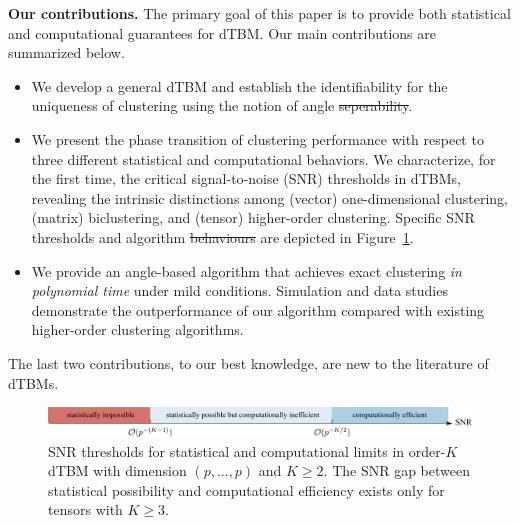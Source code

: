 \documentclass[lettersize,onecolumn,journal]{IEEEtran}
\theoremstyle{definition}
\theoremstyle{definition}
\providecommand{\DIFaddtex}[1]{{\protect\color{blue}\uwave{#1}}} %
\providecommand{\DIFdeltex}[1]{{\protect\color{red}\sout{#1}}}                      %
\providecommand{\DIFaddbegin}{} %
\providecommand{\DIFaddend}{} %
\providecommand{\DIFdelbegin}{} %
\providecommand{\DIFdelend}{} %
\providecommand{\DIFadd}[1]{\texorpdfstring{\DIFaddtex{#1}}{#1}} %
\providecommand{\DIFdel}[1]{\texorpdfstring{\DIFdeltex{#1}}{}} %
\newcommand{\DIFscaledelfig}{0.5}
\newlength{\DIFdelgraphicswidth} %
\newlength{\DIFdelgraphicsheight} %
\newcommand{\DIFaddincludegraphics}[2][]{{\color{blue}\fbox{\DIFOincludegraphics[#1]{#2}}}} %
\newcommand{\DIFdelincludegraphics}[2][]{%
\sbox{\DIFdelgraphicsbox}{\DIFOincludegraphics[#1]{#2}}%
\settoboxwidth{\DIFdelgraphicswidth}{\DIFdelgraphicsbox} %
\settoboxtotalheight{\DIFdelgraphicsheight}{\DIFdelgraphicsbox} %
\scalebox{\DIFscaledelfig}{%
\parbox[b]{\DIFdelgraphicswidth}{\usebox{\DIFdelgraphicsbox}\\[-\baselineskip] \rule{\DIFdelgraphicswidth}{0em}}\llap{\resizebox{\DIFdelgraphicswidth}{\DIFdelgraphicsheight}{%
\setlength{\unitlength}{\DIFdelgraphicswidth}%
\begin{picture}(1,1)%
\thicklines\linethickness{2pt} %
{\color[rgb]{1,0,0}\put(0,0){\framebox(1,1){}}}%
{\color[rgb]{1,0,0}\put(0,0){\line( 1,1){1}}}%
{\color[rgb]{1,0,0}\put(0,1){\line(1,-1){1}}}%
\end{picture}%
}\hspace*{3pt}}} %
} %
\DeclareRobustCommand{\DIFaddbegin}{\DIFOaddbegin \let\includegraphics\DIFaddincludegraphics} %
\DeclareRobustCommand{\DIFaddend}{\DIFOaddend \let\includegraphics\DIFOincludegraphics} %
\DeclareRobustCommand{\DIFdelbegin}{\DIFOdelbegin \let\includegraphics\DIFdelincludegraphics} %
\DeclareRobustCommand{\DIFdelend}{\DIFOaddend \let\includegraphics\DIFOincludegraphics} %
\begin{document}
{\bf Our contributions.} The primary goal of this paper is to provide both statistical and computational guarantees for dTBM. Our main contributions are summarized below.
\begin{itemize}[leftmargin=*]

 \item We develop a general dTBM and establish the identifiability for the uniqueness of clustering using the notion of angle \DIFdelbegin \DIFdel{seperability}\DIFdelend \DIFaddbegin \DIFadd{separability}\DIFaddend .

\item  We present the phase transition of clustering performance with respect to three different statistical and computational behaviors.  We characterize, for the first time, the critical signal-to-noise (SNR) thresholds in dTBMs, revealing the intrinsic distinctions among (vector) one-dimensional clustering, (matrix) biclustering, and (tensor) higher-order clustering. Specific SNR thresholds and algorithm \DIFdelbegin \DIFdel{behaviours }\DIFdelend \DIFaddbegin \DIFadd{behaviors }\DIFaddend are depicted in  Figure~\ref{fig:phase_axis}. 

 \item We provide an angle-based algorithm that achieves exact clustering \emph{in polynomial time} under mild conditions. Simulation and data studies demonstrate the outperformance of our algorithm compared with existing higher-order clustering algorithms. 
\end{itemize}
The last two contributions, to our best knowledge, are new to the literature of dTBMs. 



\begin{figure}[t]
    \centering
    \includegraphics[width = 17cm]{phase.pdf}
    \caption{SNR thresholds for statistical and computational limits in order-$K$ dTBM with dimension $(p,...,p)$ and $K \geq 2$. The SNR gap between statistical possibility and computational efficiency  exists only for tensors with $K \geq 3$. }
    \label{fig:phase_axis}
\end{figure}
\end{document}
